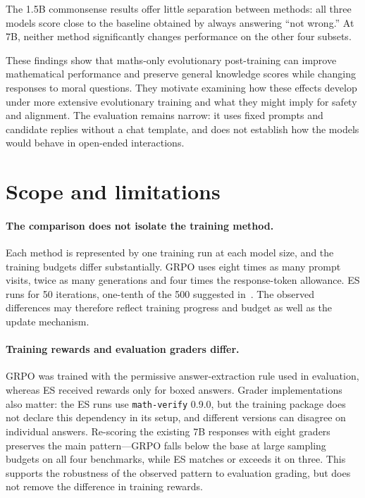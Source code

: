 \documentclass[10pt]{article}
\begin{document}
The 1.5B commonsense results offer little separation between methods: all three models score close to the baseline obtained by always answering ``not wrong.'' At 7B, neither method significantly changes performance on the other four subsets.

These findings show that maths-only evolutionary post-training can improve mathematical performance and preserve general knowledge scores while changing responses to moral questions. They motivate examining how these effects develop under more extensive evolutionary training and what they might imply for safety and alignment. The evaluation remains narrow: it uses fixed prompts and candidate replies without a chat template, and does not establish how the models would behave in open-ended interactions.

\section{Scope and limitations}\label{sec:lim}
\paragraph{The comparison does not isolate the training method.} Each method is represented by one training run at each model size, and the training budgets differ substantially. GRPO uses eight times as many prompt visits, twice as many generations and four times the response-token allowance. ES runs for 50 iterations, one-tenth of the 500 suggested in~\cite{qiu}. The observed differences may therefore reflect training progress and budget as well as the update mechanism.

\paragraph{Training rewards and evaluation graders differ.} GRPO was trained with the permissive answer-ex\-traction rule used in evaluation, whereas ES received rewards only for boxed answers. Grader implementations also matter: the ES runs use \texttt{math-verify} 0.9.0, but the training package does not declare this dependency in its setup, and different versions can disagree on individual answers. Re-scoring the existing 7B responses with eight graders preserves the main pattern---GRPO falls below the base at large sampling budgets on all four benchmarks, while ES matches or exceeds it on three. This supports the robustness of the observed pattern to evaluation grading, but does not remove the difference in training rewards.
\end{document}
